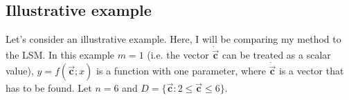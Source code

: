 \documentclass[11pt,a4paper]{article}
\numberwithin{equation}{subsection}
\newcommand{\vecc}{\vec{\textbf{c}}}
\begin{document}
\subsection{Illustrative example}
Let's consider an illustrative example. Here, I will be comparing my method to the LSM. In this example $m=1$ (i.e. the vector $\dot{\vecc}$ can be treated as a scalar value), $y=f(\vecc;x)$ is a function with one parameter, where $\dot{\vecc}$ is a vector that has to be found. Let $n=6$ and $D=\{ \vecc: 2 \leq \vecc \leq 6 \}$.
\end{document}
